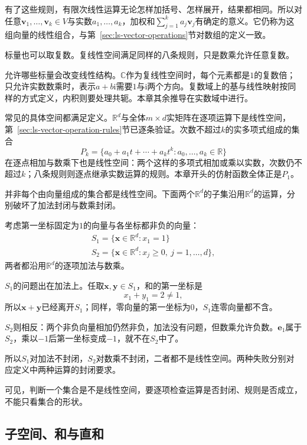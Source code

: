 有了这些规则，有限次线性运算无论怎样加括号、怎样展开，结果都相同。所以对任意$\bm v_1,\ldots,\bm v_k\in V$与实数$a_1,\ldots,a_k$，加权和$\sum_{j=1}^ka_j\bm v_j$有确定的意义。它仍称为这组向量的线性组合，与第~\ref{sec:ls-vector-operations}节对数组的定义一致。

标量也可以取复数。复线性空间满足同样的八条规则，只是数乘允许任意复数。

允许哪些标量会改变线性结构。$\mathbb C$作为复线性空间时，每个元素都是$1$的复数倍；只允许实数数乘时，表示$a+b\mathrm i$需要$1$与$\mathrm i$两个方向。复数域上的基与线性映射按同样的方式定义，内积则要处理共轭。本章其余推导在实数域中进行。

常见的具体空间都满足定义。$\mathbb R^d$与全体$m\times d$实矩阵在逐项运算下是线性空间，第~\ref{sec:ls-vector-operation-rules}节已逐条验证。次数不超过$k$的实多项式组成的集合
\[
 P_k=\{a_0+a_1t+\cdots+a_kt^k:a_0,\ldots,a_k\in\mathbb R\}
\]
在逐点相加与数乘下也是线性空间：两个这样的多项式相加或乘以实数，次数仍不超过$k$；八条规则则逐点继承实数运算的规则。本章开头的仿射函数全体正是$P_1$。

并非每个由向量组成的集合都是线性空间。下面两个$\mathbb R^d$的子集沿用$\mathbb R^d$的运算，分别破坏了加法封闭与数乘封闭。
\begin{example}[反例：仿射约束集与非负向量集]
\label{ex:ls-non-vector-space-sets}
考虑第一坐标固定为$1$的向量与各坐标都非负的向量：
\[
 \begin{gathered}
S_1=\{\bm x\in\mathbb R^d:x_1=1\}\\
S_2=\{\bm x\in\mathbb R^d:x_j\geq0,\ j=1,\ldots,d\},
 \end{gathered}
\]
两者都沿用$\mathbb R^d$的逐项加法与数乘。

$S_1$的问题出在加法上。任取$\bm x,\bm y\in S_1$，和的第一坐标是
\[
 x_1+y_1=2\neq1,
\]
所以$\bm x+\bm y$已经离开$S_1$；同样，零向量的第一坐标为$0$，$S_1$连零向量都不含。

$S_2$则相反：两个非负向量相加仍然非负，加法没有问题，但数乘允许负数。$\bm e_1$属于$S_2$，乘以$-1$后第一坐标变成$-1$，就不在$S_2$中了。

所以$S_1$对加法不封闭，$S_2$对数乘不封闭，二者都不是线性空间。两种失败分别对应定义中两种运算的封闭要求。
\end{example}
可见，判断一个集合是不是线性空间，要逐项检查运算是否封闭、规则是否成立，不能只看集合的形状。

\subsection{子空间、和与直和}
\label{sec:ls-subspaces}
\label{sec:linear-algebra-relations}
\label{sec:linear-algebra-subspace-relations}
\label{sec:ls-subspace-definition}

